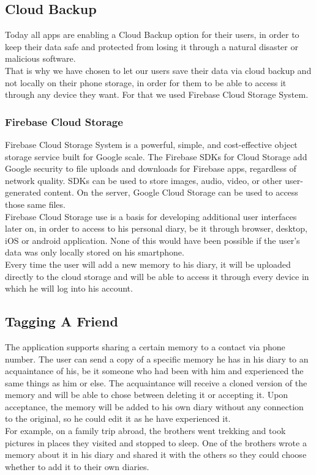 \documentclass{article}
\begin{document}
\subsection{Cloud Backup}
Today all apps are enabling a Cloud Backup option for their users, in order to keep their data safe and protected from losing it through a natural disaster or malicious software.\\
That is why we have chosen to let our users save their data via cloud backup and not locally on their phone storage, in order for them to be able to access it through any device they want. For that we used Firebase Cloud Storage System.
\subsubsection{Firebase Cloud Storage}
Firebase Cloud Storage System is a powerful, simple, and cost-effective object storage service built for Google scale. The Firebase SDKs for Cloud Storage add Google security to file uploads and downloads for Firebase apps, regardless of network quality. SDKs can be used to store images, audio, video, or other user-generated content. On the server, Google Cloud Storage can be used to access those same files.\\
Firebase Cloud Storage use is a basis for developing additional user interfaces later on, in order to access to his personal diary, be it through browser, desktop, iOS or android application. None of this would have been possible if the user's data was only locally stored on his smartphone.\\ 
Every time the user will add a new memory to his diary, it will be uploaded directly to the cloud storage and will be able to access it through every device in which he will log into his account.
\subsection{Tagging A Friend}
The application supports sharing a certain memory to a contact via phone number. The user can send a copy of a specific memory he has in his diary to an acquaintance of his, be it someone who had been with him and experienced the same things as him or else. The acquaintance will receive a cloned version of the memory and will be able to chose between deleting it or accepting it. Upon acceptance, the memory will be added to his own diary without any connection to the original, so he could edit it as he have experienced it.\\ 
For example, on a family trip abroad, the brothers went trekking and took pictures in places they visited and stopped to sleep. One of the brothers wrote a memory about it in his diary and shared it with the others so they could choose whether to add it to their own diaries.
\end{document}
